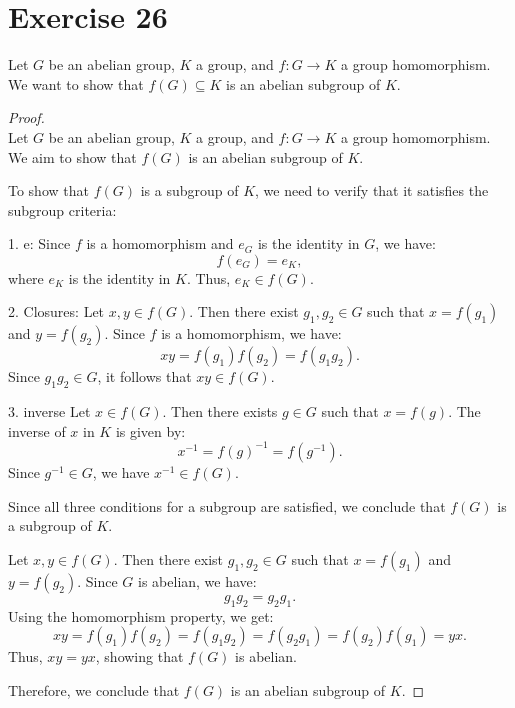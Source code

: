 \documentclass{article}
\begin{document}
    \section*{Exercise 26}
    Let $G$ be an abelian group, $K$ a group, and $f: G \to K$ a group homomorphism. We want to show that $f(G) \subseteq K$ is an abelian subgroup of $K$.
    \begin{proof}
        \leavevmode \\ 
        Let \( G \) be an abelian group, \( K \) a group, and \( f: G \to K \) a group homomorphism. We aim to show that \( f(G) \) is an abelian subgroup of \( K \).

        
        To show that \( f(G) \) is a subgroup of \( K \), we need to verify that it satisfies the subgroup criteria:
        
        1. e: Since \( f \) is a homomorphism and \( e_G \) is the identity in \( G \), we have:
           \[
           f(e_G) = e_K,
           \]
           where \( e_K \) is the identity in \( K \). Thus, \( e_K \in f(G) \).
        
        2. Closures: Let \( x, y \in f(G) \). Then there exist \( g_1, g_2 \in G \) such that \( x = f(g_1) \) and \( y = f(g_2) \). Since \( f \) is a homomorphism, we have:
           \[
           xy = f(g_1) f(g_2) = f(g_1 g_2).
           \]
           Since \( g_1 g_2 \in G \), it follows that \( xy \in f(G) \).
        
        3. inverse Let \( x \in f(G) \). Then there exists \( g \in G \) such that \( x = f(g) \). The inverse of \( x \) in \( K \) is given by:
           \[
           x^{-1} = f(g)^{-1} = f(g^{-1}).
           \]
           Since \( g^{-1} \in G \), we have \( x^{-1} \in f(G) \).
        
        Since all three conditions for a subgroup are satisfied, we conclude that \( f(G) \) is a subgroup of \( K \).
        
  
        
        Let \( x, y \in f(G) \). Then there exist \( g_1, g_2 \in G \) such that \( x = f(g_1) \) and \( y = f(g_2) \). Since \( G \) is abelian, we have:
        \[
        g_1 g_2 = g_2 g_1.
        \]
        Using the homomorphism property, we get:
        \[
        xy = f(g_1) f(g_2) = f(g_1 g_2) = f(g_2 g_1) = f(g_2) f(g_1) = yx.
        \]
        Thus, \( xy = yx \), showing that \( f(G) \) is abelian.
        
        Therefore, we conclude that \( f(G) \) is an abelian subgroup of \( K \).
    \end{proof}
\end{document}
